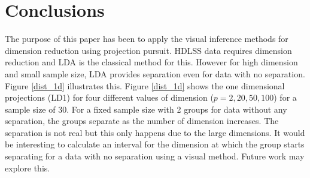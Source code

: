 %
% 
%
%


\section{Conclusions}

The purpose of this paper has been to apply the visual inference methods for dimension reduction using projection pursuit. HDLSS data requires dimension reduction and LDA is the classical method for this. However for high dimension and small sample size, LDA provides separation even for data with no separation. Figure \ref{dist_1d} illustrates this. Figure \ref{dist_1d} shows the one dimensional projections (LD1) for four different values of dimension ($p = 2, 20, 50, 100$) for a sample size of 30. For a fixed sample size with 2 groups for data without any separation, the groups separate as the number of dimension increases. The separation is not real but this only happens due to the large dimensions. It would be interesting to calculate an interval for the dimension at which the group starts separating for a data with no separation using a visual method. Future work may explore this.

